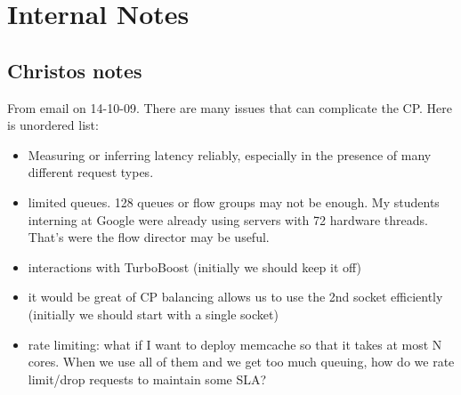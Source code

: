 
\section{Internal Notes}

\subsection{Christos notes}

From email on 14-10-09. There are many issues that can complicate the CP. Here is unordered list:

\begin{itemize}

\item Measuring or inferring latency reliably, especially in the presence of many different request types. 
\item  limited queues. 128 queues or flow groups may not be enough. My students interning at Google were already using servers with 72 hardware threads. That’s were the flow director may be useful. 

\item  interactions with TurboBoost  (initially we should keep it off)
\item  it would be great of CP balancing allows us to use the 2nd socket efficiently (initially we should start with a single socket)
\item rate limiting: what if I want to deploy memcache so that it takes at most N cores. When we use all of them and we get too much queuing, how do we rate limit/drop requests to maintain some SLA? 

\end{itemize}


